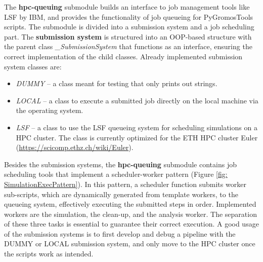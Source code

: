 The \textbf{hpc-queuing} submodule builds an interface to job management tools like LSF by IBM, and provides the functionality of job queueing for PyGromosTools scripts. The submodule is divided into a submission system and a job scheduling part. The \textbf{submission system} is structured into an OOP-based structure with the parent class \textit{\_SubmissionSystem} that functions as an interface, ensuring the correct implementation of the child classes. Already implemented submission system classes are: 
\begin{itemize}
\item \textit{DUMMY} -- a class meant for testing that only prints out strings. 
\item \textit{LOCAL} -- a class to execute a submitted job directly on the local machine via the operating system.
\item \textit{LSF} -- a class to use the LSF queueing system for scheduling simulations on a HPC cluster. The class is currently optimized for the ETH HPC cluster Euler (\url{https://scicomp.ethz.ch/wiki/Euler}).
\end{itemize}
Besides the submission systems, the \textbf{hpc-queuing} submodule contains job scheduling tools that implement a scheduler-worker pattern (Figure \ref{fig: SimulationExecPattern}). In this pattern, a scheduler function submits worker sub-scripts, which are dynamically generated from template workers, to the queueing system, effectively executing the submitted steps in order. Implemented workers are the simulation, the clean-up, and the analysis worker. The separation of these three tasks is essential to guarantee their correct execution.
%
A good usage of the submission systems is to first develop and debug a pipeline with the DUMMY or LOCAL submission system, and only move to the HPC cluster once the scripts work as intended. %

